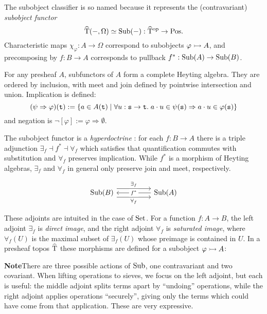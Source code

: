 \documentclass[stthol.tex]{subfiles}
\begin{document}
The subobject classifier is so named because it represents the (contravariant) \textit{subobject functor}
$$\widehat{\mathrm{T}}(-,\Omega)\simeq \mathrm{Sub}(-):\widehat{\mathrm{T}}^{\mathrm{op}}\to \mathrm{Pos}.$$
Characteristic maps $\chi_\varphi:A\to \Omega$ correspond to subobjects $\varphi\rightarrowtail A$, and precomposing by $f:B\to A$ corresponds to pullback $f^*:\mathrm{Sub}(A)\to \mathrm{Sub}(B)$.

For any presheaf $A$, subfunctors of $A$ form a complete Heyting algebra. They are ordered by inclusion, with meet and join defined by pointwise intersection and union. Implication is defined:
$$(\psi\Rightarrow \varphi)(\mathtt{t}) := \{a\in A(\mathtt{t}) \; | \; \forall u:\mathtt{s}\to \mathtt{t}. \; a\cdot u\in \psi(\mathtt{s})\Rightarrow a\cdot u\in \varphi(\mathtt{s})\}$$
and negation is $\neg[\varphi]:= \varphi \Rightarrow \emptyset$.

\begin{lemma}
The subobject functor is a \textit{hyperdoctrine} \cite{hyper}: for each $f:B\to A$ there is a triple adjunction
$\exists_f \dashv f^* \dashv \forall_f$ which satisfies that quantification commutes with substitution and $\forall_f$ preserves implication. While $f^*$ is a morphism of Heyting algebras, $\exists_f$ and $\forall_f$ in general only preserve join and meet, respectively.
\end{lemma} \vspace*{-\baselineskip}
\[\begin{tikzcd}
    \Sub(B) \arrow[rr,"\exists_f",yshift=0.6em] \arrow[rr,"\forall_f",yshift=-0.6em,swap] && \Sub(A) \arrow[ll,"f^*" description]
  \end{tikzcd}\]

These adjoints are intuited in the case of $\mathrm{Set}$. For a function $f:A\to B$, the left adjoint $\exists_f$ is \textit{direct image}, and the right adjoint $\forall_f$ is \textit{saturated image}, where $\forall_f(U)$ is the maximal subset of $\exists_f(U)$ whose preimage is contained in $U$. In a presheaf topos $\widehat{\mathrm{T}}$ these morphisms are defined for a subobject $\varphi \rightarrowtail A$:


\textbf{Note}\quad There are three possible actions of $\mathrm{Sub}$, one contravariant and two covariant. When lifting operations to sieves, we focus on the left adjoint, but each is useful: the middle adjoint splits terms apart by ``undoing'' operations, while the right adjoint applies operations ``securely'', giving only the terms which could have come from that application. These are very expressive.
\end{document}
